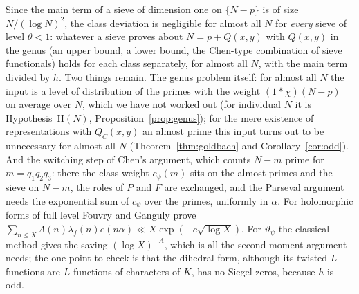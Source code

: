 ﻿\documentclass[11pt]{amsart}
\theoremstyle{remark}
\newcommand{\vt}{\vartheta}
\begin{document}
Since the main term of a sieve of dimension one on $\{N-p\}$ is of size $N/(\log N)^2$, the class deviation is negligible for almost all $N$ for \emph{every} sieve of level $\theta<1$: whatever a sieve proves about $N=p+Q(x,y)$ with $Q(x,y)$ in the genus (an upper bound, a lower bound, the Chen-type combination of sieve functionals) holds for each class separately, for almost all $N$, with the main term divided by $h$. Two things remain. The genus problem itself: for almost all $N$ the input is a level of distribution of the primes with the weight $(1*\chi)(N-p)$ on average over $N$, which we have not worked out (for individual $N$ it is Hypothesis~$\mathrm H(N)$, Proposition~\ref{prop:genus}); for the mere existence of representations with $Q_C(x,y)$ an almost prime this input turns out to be unnecessary for almost all $N$ (Theorem~\ref{thm:goldbach} and Corollary~\ref{cor:odd}). And the switching step of Chen's argument, which counts $N-m$ prime for $m=q_1q_2q_3$: there the class weight $c_\psi(m)$ sits on the almost primes and the sieve on $N-m$, the roles of $P$ and $F$ are exchanged, and the Parseval argument needs the exponential sum of $c_\psi$ over the primes, uniformly in $\alpha$. For holomorphic forms of full level Fouvry and Ganguly \cite{FG} prove $\sum_{n\le X}\Lambda(n)\lambda_f(n)e(n\alpha)\ll X\exp(-c\sqrt{\log X})$. For $\vt_\psi$ the classical method gives the saving $(\log X)^{-A}$, which is all the second-moment argument needs; the one point to check is that the dihedral form, although its twisted $L$-functions are $L$-functions of characters of $K$, has no Siegel zeros, because $h$ is odd.
\end{document}
